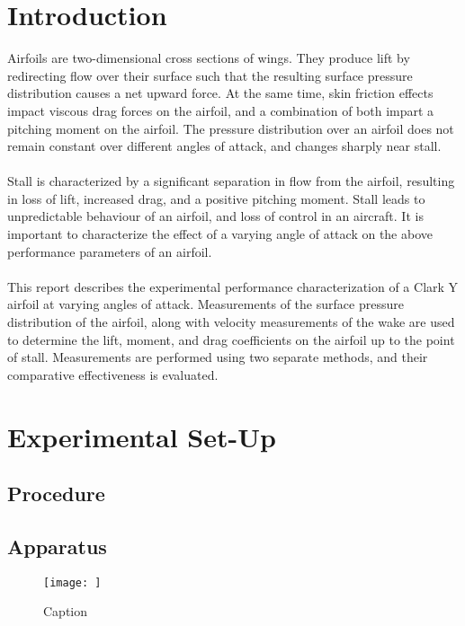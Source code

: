 \documentclass[runningheads]{llncs}
\begin{document}
\section{Introduction}
Airfoils are two-dimensional cross sections of wings. They produce lift by redirecting flow over their surface such that the resulting surface pressure distribution causes a net upward force. At the same time, skin friction effects impact viscous drag forces on the airfoil, and a combination of both impart a pitching moment on the airfoil. The pressure distribution over an airfoil does not remain constant over different angles of attack, and changes sharply near stall.\\
\\
Stall is characterized by a significant separation in flow from the airfoil, resulting in loss of lift, increased drag, and a positive pitching moment. Stall leads to unpredictable behaviour of an airfoil, and loss of control in an aircraft. It is important to characterize the effect of a varying angle of attack on the above performance parameters of an airfoil.\\
\\
This report describes the experimental performance characterization of a Clark Y airfoil at varying angles of attack. Measurements of the surface pressure distribution of the airfoil, along with velocity measurements of the wake are used to determine the lift, moment, and drag coefficients on the airfoil up to the point of stall. Measurements are performed using two separate methods, and their comparative effectiveness is evaluated.



\section{Experimental Set-Up}
\subsection{Procedure}
\subsection{Apparatus}
\begin{figure}
    \centering
    \texttt{[image: ]}
    \caption{Caption}
    \label{fig:my_label}
\end{figure}
\end{document}
